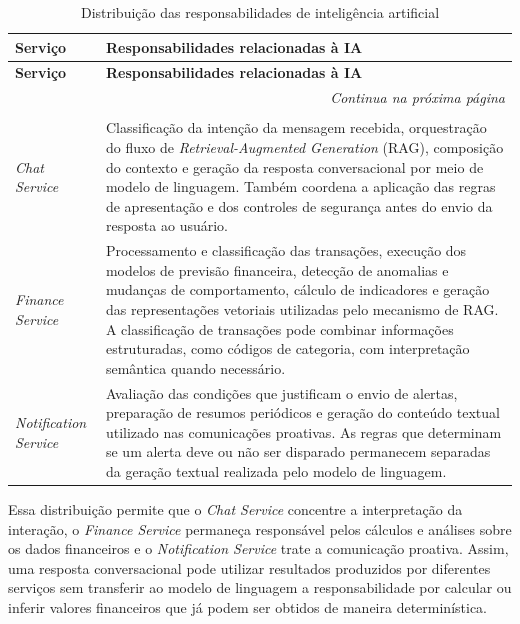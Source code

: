 {\small
\begin{longtable}{|p{3.3cm}|p{11.0cm}|}
\caption{Distribuição das responsabilidades de inteligência artificial}
\label{quad:ia_responsabilidades} \\
\hline
\textbf{Serviço} & \textbf{Responsabilidades relacionadas à IA} \\ \hline
\endfirsthead
\hline
\textbf{Serviço} & \textbf{Responsabilidades relacionadas à IA} \\ \hline
\endhead
\hline
\multicolumn{2}{r}{\fontsize{10pt}{10pt}\selectfont\textit{Continua na próxima página}} \\
\endfoot
\hline
\multicolumn{2}{c}{\fontsize{10pt}{10pt}\selectfont \textbf{Fonte:} Elaborado pelos autores (2026).} \\
\endlastfoot

\textit{Chat Service} &
Classificação da intenção da mensagem recebida, orquestração do fluxo de \textit{Retrieval-Augmented Generation} (RAG), composição do contexto e geração da resposta conversacional por meio de modelo de linguagem. Também coordena a aplicação das regras de apresentação e dos controles de segurança antes do envio da resposta ao usuário.
\\ \hline

\textit{Finance Service} &
Processamento e classificação das transações, execução dos modelos de previsão financeira, detecção de anomalias e mudanças de comportamento, cálculo de indicadores e geração das representações vetoriais utilizadas pelo mecanismo de RAG. A classificação de transações pode combinar informações estruturadas, como códigos de categoria, com interpretação semântica quando necessário.
\\ \hline

\textit{Notification Service} &
Avaliação das condições que justificam o envio de alertas, preparação de resumos periódicos e geração do conteúdo textual utilizado nas comunicações proativas. As regras que determinam se um alerta deve ou não ser disparado permanecem separadas da geração textual realizada pelo modelo de linguagem.
\\ \hline

\end{longtable}
}

Essa distribuição permite que o \textit{Chat Service} concentre a interpretação da interação, o \textit{Finance Service} permaneça responsável pelos cálculos e análises sobre os dados financeiros e o \textit{Notification Service} trate a comunicação proativa. Assim, uma resposta conversacional pode utilizar resultados produzidos por diferentes serviços sem transferir ao modelo de linguagem a responsabilidade por calcular ou inferir valores financeiros que já podem ser obtidos de maneira determinística.

